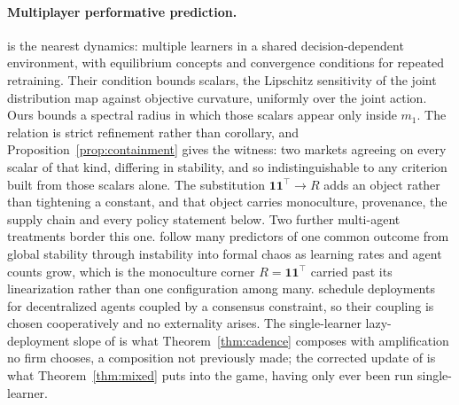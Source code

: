 \documentclass{article}
\theoremstyle{plain}
\theoremstyle{definition}
\begin{document}
\paragraph{Multiplayer performative prediction.}
\citet{narang2023} is the nearest dynamics: multiple learners in a shared decision-dependent environment, with equilibrium concepts and convergence conditions for repeated retraining. Their condition bounds scalars, the Lipschitz sensitivity of the joint distribution map against objective curvature, uniformly over the joint action. Ours bounds a spectral radius in which those scalars appear only inside $m_1$. The relation is strict refinement rather than corollary, and Proposition~\ref{prop:containment} gives the witness: two markets agreeing on every scalar of that kind, differing in stability, and so indistinguishable to any criterion built from those scalars alone. The substitution $\mathbf{1}\mathbf{1}^{\top}\!\to R$ adds an object rather than tightening a constant, and that object carries monoculture, provenance, the supply chain and every policy statement below. Two further multi-agent treatments border this one. \citet{piliouras2023} follow many predictors of one common outcome from global stability through instability into formal chaos as learning rates and agent counts grow, which is the monoculture corner $R = \mathbf{1}\mathbf{1}^{\top}$ carried past its linearization rather than one configuration among many. \citet{li2022} schedule deployments for decentralized agents coupled by a consensus constraint, so their coupling is chosen cooperatively and no externality arises. The single-learner lazy-deployment slope of \citet{mendlerdunner2020} is what Theorem~\ref{thm:cadence} composes with amplification no firm chooses, a composition not previously made; the corrected update of \citet{izzo2021} is what Theorem~\ref{thm:mixed} puts into the game, having only ever been run single-learner.
\end{document}
